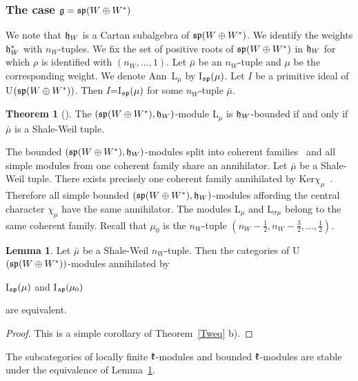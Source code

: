 \documentclass[12pt]{amsart}
\theoremstyle{definition}\newtheorem{theorem}{Theorem}[section]
\newtheorem{lemma}[proposition]{Lemma}
\theoremstyle{definition}\newtheorem{definition}[proposition]{Definition}
\theoremstyle{remark}\newtheorem{example}[proposition]{Example}
\begin{document}
\subsubsection{The case $\frak g=\frak{sp}(W\oplus W^*)$}We note that $\frak h_W$ is a Cartan subalgebra of $\frak{sp}(W\oplus W^*)$. We identify the weights $\frak h_W^*$ with $n_W$-tuples. We fix the set of positive roots of $\frak{sp}(W\oplus W^*)$ in $\frak h_W$ for which $\rho$ is identified with $(n_W,..., 1)$. Let $\bar\mu$ be an $n_W$-tuple and $\mu$ be the corresponding weight. We denote Ann~L$_\mu$ by I$_{\frak{sp}}(\mu)$. Let $I$ be a primitive ideal of U$(\frak{sp}(W\oplus W^*))$. Then $I$=I$_\frak{sp}(\mu)$ for some $n_W$-tuple $\bar\mu$.
\begin{theorem}[\cite{M}]\label{Tbwm} The $(\frak{sp}(W\oplus W^*), \frak h_W)$-module L$_\mu$ is $\frak h_W$-bounded if and only if $\bar\mu$ is a Shale-Weil tuple.\end{theorem}
The bounded $(\frak{sp}(W\oplus W^*), \frak h_W)$-modules split into coherent families~\cite{M} and all simple modules from one coherent family share an annihilator. Let $\bar\mu$ be a Shale-Weil tuple. There exists precisely one coherent family annihilated by Ker$\chi_\mu$~\cite{M}. Therefore all simple bounded $(\frak{sp}(W\oplus W^*), \frak h_W)$-modules affording the central character $\chi_\mu$ have the same annihilator. The modules L$_\mu$ and L$_{\sigma\mu}$ belong to the same coherent family. Recall that $\mu_0$ is the $n_W$-tuple $(n_W-\frac{1}{2}, n_W-\frac{3}{2},..., \frac{1}{2})$.
\begin{lemma}\label{L332}Let $\bar\mu$ be a Shale-Weil $n_W$-tuple. Then the categories of U$(\frak{sp}(W\oplus W^*))$-modules annihilated by \begin{center}I$_\frak{sp}(\mu)$ and I$_\frak{sp}(\mu_0)$\end{center} are equivalent.\end{lemma}
\begin{proof}This is a simple corollary of Theorem~\ref{Tweq} b).\end{proof}
The subcategories of locally finite $\frak k$-modules and bounded
$\frak k$-modules are stable under the equivalence of
Lemma~\ref{L332}.
\end{document}
